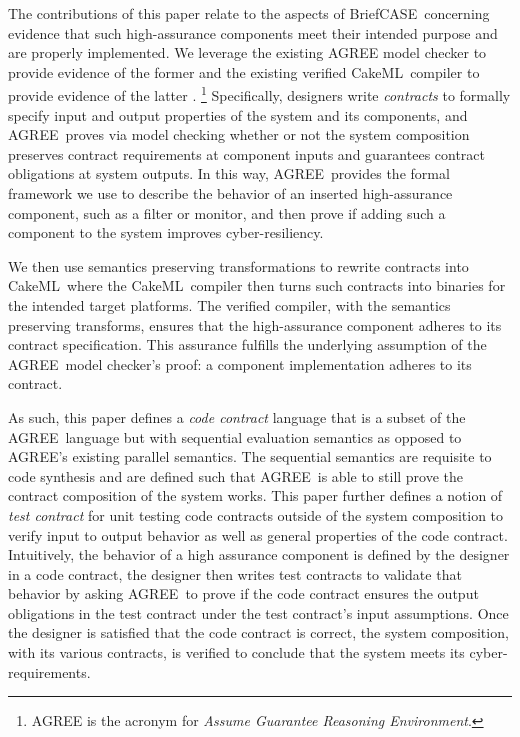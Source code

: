 \documentclass[global,twocolumn]{svjour}
\newcommand{\brfcs}{BriefCASE}
\newcommand{\agr}{AGREE}
\newcommand{\ckml}{CakeML}
\begin{document}
The contributions of this paper relate to the aspects of \brfcs\ concerning evidence that such high-assurance components meet their intended purpose and are properly implemented.
%
We leverage the existing {\agr} model checker to provide evidence of the former and the existing verified \ckml\ compiler to provide evidence of the latter \cite{agree2013,compositional-analysis-agree,nfm:agree,cakeml}.
%
\footnote{AGREE is the acronym for \emph{Assume Guarantee Reasoning Environment}.}
%
Specifically, designers write \emph{contracts} to formally specify input and output properties of the system and its components, and \agr\ proves via model checking whether or not the system composition preserves contract requirements at component inputs and guarantees contract obligations at system outputs.
%
In this way, \agr\ provides the formal framework we use to describe the behavior of an inserted high-assurance component, such as a filter or monitor, and then prove if adding such a component to the system improves cyber-resiliency.

We then use semantics preserving transformations to rewrite contracts into \ckml\ where the \ckml\ compiler then turns such contracts into binaries for the intended target platforms.
%
The verified compiler, with the semantics preserving transforms, ensures that the high-assurance component adheres to its contract specification.
%
This assurance fulfills the underlying assumption of the \agr\ model checker's proof: a component implementation adheres to its contract.

As such, this paper defines a \emph{code contract} language that is a subset of the \agr\ language but with sequential evaluation semantics as opposed to \agr's existing parallel semantics.
%
The sequential semantics are requisite to code synthesis and are defined such that \agr\ is able to still prove the contract composition of the system works.
%
This paper further defines a notion of \emph{test contract} for unit testing code contracts outside of the system composition to verify input to output behavior as well as general properties of the code contract.
%
Intuitively, the behavior of a high assurance component is defined by the designer in a code contract, the designer then writes test contracts to validate that behavior by asking \agr\ to prove if the code contract ensures the output obligations in the test contract under the test contract's input assumptions.
%
Once the designer is satisfied that the code contract is correct, the system composition, with its various contracts, is verified to conclude that the system meets its cyber-requirements.
\end{document}
